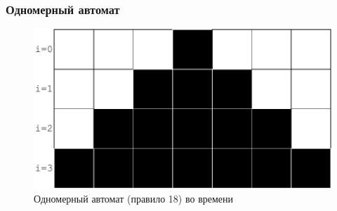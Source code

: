 \documentclass{beamer}
\begin{document}
    \begin{frame}
        \frametitle{Одномерный автомат}
        \begin{figure}
            \begin{center}
                \includegraphics[width=\linewidth]{pict/oneD18}
            \end{center}
            \caption{Одномерный автомат (правило 18) во времени}
            \label{fig:oneD18}
        \end{figure}
    \end{frame}

\end{document}
